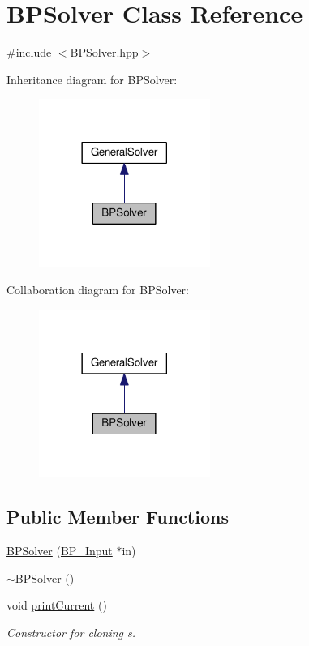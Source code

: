\hypertarget{class_b_p_solver}{\section{B\-P\-Solver Class Reference}
\label{class_b_p_solver}
}


{\ttfamily \#include $<$B\-P\-Solver.\-hpp$>$}



Inheritance diagram for B\-P\-Solver\-:\nopagebreak
\begin{figure}[H]
\begin{center}
\leavevmode
\includegraphics[width=158pt]{class_b_p_solver__inherit__graph}
\end{center}
\end{figure}


Collaboration diagram for B\-P\-Solver\-:\nopagebreak
\begin{figure}[H]
\begin{center}
\leavevmode
\includegraphics[width=158pt]{class_b_p_solver__coll__graph}
\end{center}
\end{figure}
\subsection*{Public Member Functions}
\begin{DoxyCompactItemize}
\item 
\hyperlink{class_b_p_solver_ade768d74f063c00a42b7e4a86f68ff01}{B\-P\-Solver} (\hyperlink{class_b_p___input}{B\-P\-\_\-\-Input} $\ast$in)
\item 
\hyperlink{class_b_p_solver_a22159c0b1f342264f8271b8f44d260ab}{$\sim$\-B\-P\-Solver} ()
\item 
void \hyperlink{class_b_p_solver_adeb9db9fda332fb71b99262973a48d3f}{print\-Current} ()
\begin{DoxyCompactList}\small\item\em Constructor for cloning s. \end{DoxyCompactList}\end{DoxyCompactItemize}



